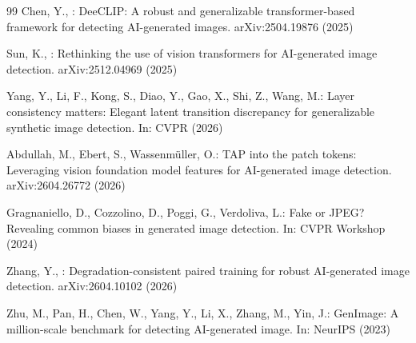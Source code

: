 \documentclass[runningheads]{llncs}
\begin{document}
\begin{thebibliography}{99}
Chen, Y., \etal: DeeCLIP: A robust and generalizable transformer-based framework for detecting AI-generated images. arXiv:2504.19876 (2025)

Sun, K., \etal: Rethinking the use of vision transformers for AI-generated image detection. arXiv:2512.04969 (2025)

Yang, Y., Li, F., Kong, S., Diao, Y., Gao, X., Shi, Z., Wang, M.: Layer consistency matters: Elegant latent transition discrepancy for generalizable synthetic image detection. In: CVPR (2026)

Abdullah, M., Ebert, S., Wassenm{\"u}ller, O.: TAP into the patch tokens: Leveraging vision foundation model features for AI-generated image detection. arXiv:2604.26772 (2026)

Gragnaniello, D., Cozzolino, D., Poggi, G., Verdoliva, L.: Fake or JPEG? Revealing common biases in generated image detection. In: CVPR Workshop (2024)

Zhang, Y., \etal: Degradation-consistent paired training for robust AI-generated image detection. arXiv:2604.10102 (2026)

Zhu, M., Pan, H., Chen, W., Yang, Y., Li, X., Zhang, M., Yin, J.: GenImage: A million-scale benchmark for detecting AI-generated image. In: NeurIPS (2023)

\end{thebibliography}
\end{document}
